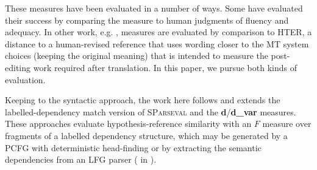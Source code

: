 \documentclass[11pt]{article}
\begin{document}
These measures have been evaluated in a number of ways.  Some
\cite{banerjee05meteor,liu05syntaxformteval,owczarzak07labelleddepseval}
have evaluated their success by comparing the measure to human
judgments of fluency and adequacy.  In other work,
e.g. , 
measures are evaluated by comparison to
HTER, a distance to a human-revised reference that uses wording closer
to the MT system choices (keeping the original meaning) that
is intended to measure the post-editing work required after
translation.  In this paper, we pursue both kinds of evaluation.


Keeping to the syntactic approach, the work here follows and extends
the labelled-dependency match version of \textsc{SParseval}
\cite{roark06:sparseval} and the \textbf{d}/\textbf{d\_var}
\cite{owczarzak07labelleddepseval} measures. These approaches evaluate
hypothesis-reference similarity with an $F$ measure over fragments of
a labelled dependency structure, which may be generated by a PCFG with
deterministic head-finding
\cite{liu05syntaxformteval,roark06:sparseval} or by extracting the
semantic dependencies from an LFG parser ( in
).  



\end{document}
